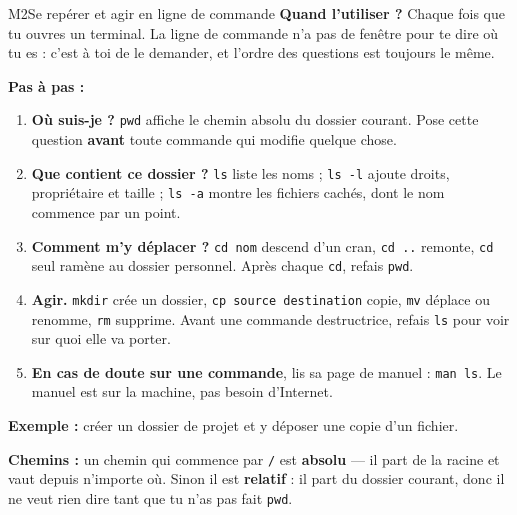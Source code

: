 \begin{fichemethode}{M2}{Se repérer et agir en ligne de commande}
\textbf{Quand l'utiliser ?} Chaque fois que tu ouvres un terminal. La ligne de commande n'a
pas de fenêtre pour te dire où tu es : c'est à toi de le demander, et l'ordre des questions
est toujours le même.

\textbf{Pas à pas :}
\begin{enumerate}
  \item \textbf{Où suis-je ?} \lstinline{pwd} affiche le chemin absolu du dossier courant.
    Pose cette question \textbf{avant} toute commande qui modifie quelque chose.
  \item \textbf{Que contient ce dossier ?} \lstinline{ls} liste les noms ;
    \lstinline{ls -l} ajoute droits, propriétaire et taille ; \lstinline{ls -a} montre les
    fichiers cachés, dont le nom commence par un point.
  \item \textbf{Comment m'y déplacer ?} \lstinline{cd nom} descend d'un cran,
    \lstinline{cd ..} remonte, \lstinline{cd} seul ramène au dossier personnel. Après chaque
    \lstinline{cd}, refais \lstinline{pwd}.
  \item \textbf{Agir.} \lstinline{mkdir} crée un dossier, \lstinline{cp source destination}
    copie, \lstinline{mv} déplace ou renomme, \lstinline{rm} supprime. Avant une commande
    destructrice, refais \lstinline{ls} pour voir sur quoi elle va porter.
  \item \textbf{En cas de doute sur une commande}, lis sa page de manuel :
    \lstinline{man ls}. Le manuel est sur la machine, pas besoin d'Internet.
\end{enumerate}

\textbf{Exemple :} créer un dossier de projet et y déposer une copie d'un fichier.


\textbf{Chemins :} un chemin qui commence par \lstinline{/} est \textbf{absolu} — il part de
la racine et vaut depuis n'importe où. Sinon il est \textbf{relatif} : il part du dossier
courant, donc il ne veut rien dire tant que tu n'as pas fait \lstinline{pwd}.


\end{fichemethode}
